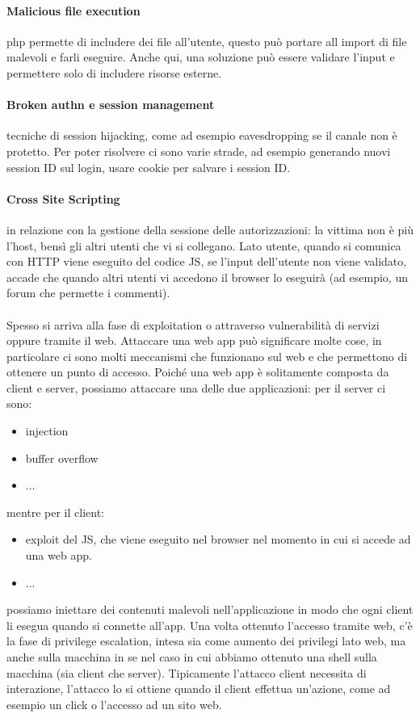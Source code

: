 \documentclass{article}
\begin{document}
\paragraph{Malicious file execution}php permette di includere dei file all'utente, questo può portare all import di file malevoli e farli eseguire. Anche qui, una soluzione può essere validare l'input e permettere solo di includere risorse esterne.
\paragraph{Broken authn  e session management}tecniche di session hijacking, come ad esempio eavesdropping se il canale non è protetto. Per poter risolvere ci sono varie strade, ad esempio generando nuovi session ID sul login, usare cookie per salvare i session ID.
\paragraph{Cross Site Scripting}in relazione con la gestione della sessione delle autorizzazioni: la vittima non è più l'host, bensì gli altri utenti che vi si collegano. Lato utente, quando si comunica con HTTP viene eseguito del codice JS, se l'input dell'utente non viene validato, accade che quando altri utenti vi accedono il browser lo eseguirà (ad esempio, un forum che permette i commenti).
\\\\ Spesso si arriva alla fase di exploitation o attraverso vulnerabilità di servizi oppure tramite il web. Attaccare una web app può significare molte cose, in particolare ci sono molti meccanismi che funzionano sul web e che permettono di ottenere un punto di accesso. Poiché una web app è solitamente composta da client e server, possiamo attaccare una delle due applicazioni: per il server ci sono:
\begin{itemize}
\item injection
\item buffer overflow
\item ...
\end{itemize}
mentre per il client:
\begin{itemize}
\item exploit del JS, che viene eseguito nel browser nel momento in cui si accede ad una web app.
\item ...
\end{itemize}
possiamo iniettare dei contenuti malevoli nell'applicazione in modo che ogni client li esegua quando si connette all'app. Una volta ottenuto l'accesso tramite web, c'è la fase di privilege escalation, intesa sia come aumento dei privilegi lato web, ma anche sulla macchina in se nel caso in cui abbiamo ottenuto una shell sulla macchina (sia client che server). Tipicamente l'attacco client necessita di interazione, l'attacco lo si ottiene quando il client effettua un'azione, come ad esempio un click o l'accesso ad un sito web.
\end{document}
